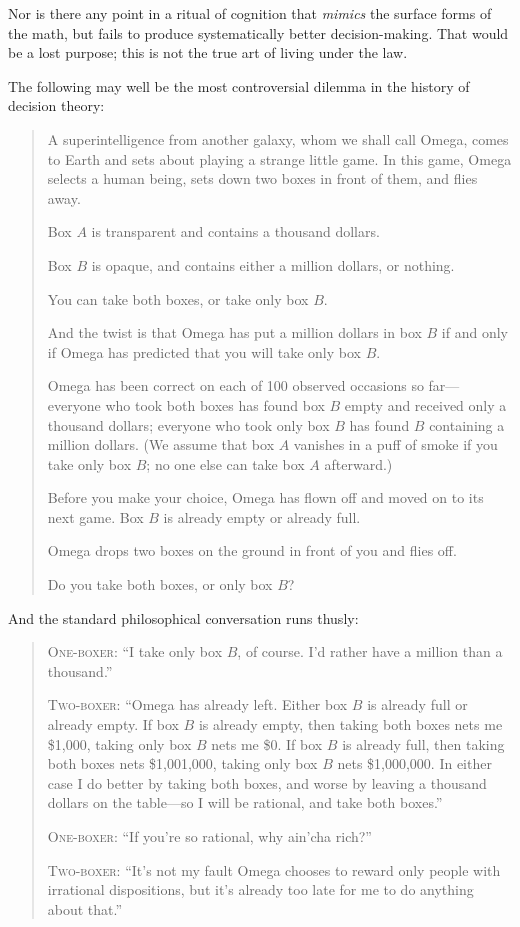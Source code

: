 {
 Nor is there any point in a ritual of cognition that
\textit{mimics} the surface forms of the math, but fails to produce
systematically better decision-making. That would be a lost purpose;
this is not the true art of living under the law.}

\myendsectiontext


{
 The following may well be the most controversial dilemma in the
history of decision theory:}

\begin{quotation}
{
 A superintelligence from another galaxy, whom we shall call Omega,
comes to Earth and sets about playing a strange little game. In this
game, Omega selects a human being, sets down two boxes in front of
them, and flies away.}

{
 Box $A$ is transparent and contains a thousand dollars.}

{
 Box $B$ is opaque, and contains either a million dollars, or
nothing.}

{
 You can take both boxes, or take only box $B$.}

{
 And the twist is that Omega has put a million dollars in box $B$ if
and only if Omega has predicted that you will take only box $B$.}

{
 Omega has been correct on each of 100 observed occasions so
far---everyone who took both boxes has found box $B$ empty and received
only a thousand dollars; everyone who took only box $B$ has found $B$
containing a million dollars. (We assume that box $A$ vanishes in a puff
of smoke if you take only box $B$; no one else can take box $A$
afterward.)}

{
 Before you make your choice, Omega has flown off and moved on to
its next game. Box $B$ is already empty or already full.}

{
 Omega drops two boxes on the ground in front of you and flies
off.}

{
  Do you take both boxes, or only box $B$?}
\end{quotation}

{
 And the standard philosophical conversation runs thusly:}

\begin{quotation}
{
 \textsc{One-boxer}: ``I take only box $B$, of course.
I'd rather have a million than a
thousand.''}

{
 \textsc{Two-boxer}: ``Omega has already left. Either box $B$
is already full or already empty. If box $B$ is already empty, then
taking both boxes nets me \$1,000, taking only box $B$ nets me \$0. If
box $B$ is already full, then taking both boxes nets \$1,001,000, taking
only box $B$ nets \$1,000,000. In either case I do better by taking both
boxes, and worse by leaving a thousand dollars on the table---so I will
be rational, and take both boxes.''}

{
 \textsc{One-boxer}: ``If you're so
rational, why ain'cha rich?''}

{
 \textsc{Two-boxer}: ``It's not my fault
Omega chooses to reward only people with irrational dispositions, but
it's already too late for me to do anything about
that.''}
\end{quotation}

